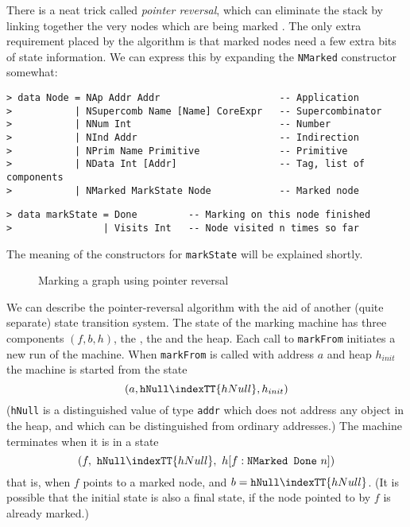 There is a neat trick called {\em pointer reversal},
which can eliminate the stack by linking together the
very nodes which are being marked \cite{PointerReversal}.
The only extra requirement placed by the algorithm is that
marked nodes need a few extra bits of state information.  We can express
this by expanding the \mbox{\tt NMarked} constructor somewhat:
\begin{verbatim}
> data Node = NAp Addr Addr                     -- Application
>           | NSupercomb Name [Name] CoreExpr   -- Supercombinator
>           | NNum Int                          -- Number
>           | NInd Addr                         -- Indirection
>           | NPrim Name Primitive              -- Primitive
>           | NData Int [Addr]                  -- Tag, list of components
>           | NMarked MarkState Node            -- Marked node
\end{verbatim}
%
%
%
%
%
%
%
\begin{verbatim}
> data markState = Done         -- Marking on this node finished
>                | Visits Int   -- Node visited n times so far
\end{verbatim}
%
%
The meaning of the constructors for \mbox{\tt markState} will be explained shortly.

\begin{figure} %

\caption{Marking a graph using pointer reversal}
\label{fig:gc}
\end{figure}
We can describe the pointer-reversal
algorithm with the aid of another (quite separate) state
transition system.
The state of the
marking machine has three components $(f,b,h)$, the ,
the  and the heap.  Each call to \mbox{\tt markFrom}
initiates a new run of the machine.  When \mbox{\tt markFrom} is called with
address $a$ and heap $h_{init}$ the machine is started from the state
\[
(a,\mbox{\tt hNull}\indexTT{hNull},h_{init})
\]
(\mbox{\tt hNull} is a distinguished value of type \mbox{\tt addr} which does not address any
object in the heap, and which can be distinguished from ordinary addresses.)
The machine terminates when it is in a state
\[
(f,~\mbox{\tt hNull}\indexTT{hNull},~ h[f:\mbox{\tt NMarked\ Done}~n])
\]
that is, when $f$ points to a marked node, and $b=\mbox{\tt hNull}\indexTT{hNull}$.
(It is possible that the initial state is also a final state, if the
node pointed to by $f$ is already marked.)

